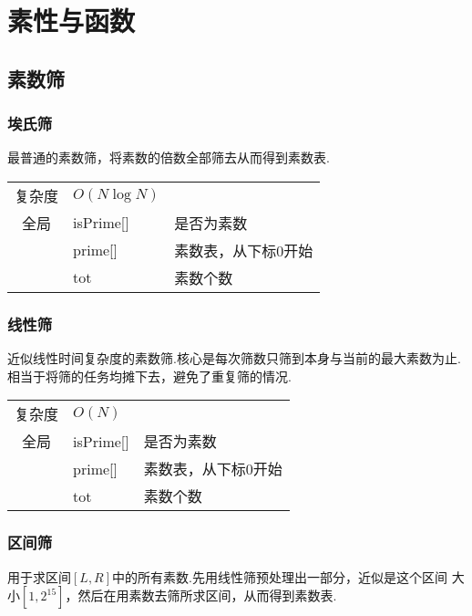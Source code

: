 \section{素性与函数}


    \subsection{素数筛}\small


        \subsubsection{埃氏筛}\small
最普通的素数筛，将素数的倍数全部筛去从而得到素数表.

\begin{longtable}{|c|l|l|}
复杂度 & $O(N \log N)$ &  \\
全局 & isPrime[] & 是否为素数 \\
 & prime[] & 素数表，从下标0开始 \\
 & tot & 素数个数 \\
\end{longtable}



        \subsubsection{线性筛}\small
近似线性时间复杂度的素数筛.核心是每次筛数只筛到本身与当前的最大素数为止.
相当于将筛的任务均摊下去，避免了重复筛的情况.

\begin{longtable}{|c|l|l|}
复杂度 & $O(N)$ &  \\
全局 & isPrime[] & 是否为素数 \\
 & prime[] & 素数表，从下标0开始 \\
 & tot & 素数个数 \\
\end{longtable}



        \subsubsection{区间筛}\small
用于求区间$[L, R]$中的所有素数.先用线性筛预处理出一部分，近似是这个区间
大小$[1, 2^{15}]$，然后在用素数去筛所求区间，从而得到素数表.

